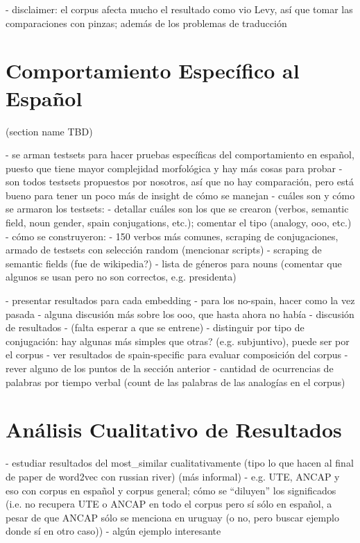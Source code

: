 - disclaimer: el corpus afecta mucho el resultado como vio Levy, así que tomar las comparaciones con pinzas; además de los problemas de traducción


\section{Comportamiento Específico al Español}
(section name TBD)

- se arman testsets para hacer pruebas específicas del comportamiento en español, puesto que tiene mayor complejidad morfológica y hay más cosas para probar
- son todos testsets propuestos por nosotros, así que no hay comparación, pero está bueno para tener un poco más de insight de cómo se manejan
- cuáles son y cómo se armaron los testsets:
    - detallar cuáles son los que se crearon (verbos, semantic field, noun gender, spain conjugations, etc.); comentar el tipo (analogy, ooo, etc.)
    - cómo se construyeron:
        - 150 verbos más comunes, scraping de conjugaciones, armado de testsets con selección random (mencionar scripts)
        - scraping de semantic fields (fue de wikipedia?)
        - lista de géneros para nouns (comentar que algunos se usan pero no son correctos, e.g. presidenta)

- presentar resultados para cada embedding
    - para los no-spain, hacer como la vez pasada
    - alguna discusión más sobre los ooo, que hasta ahora no había
- discusión de resultados
    - (falta esperar a que se entrene)
    - distinguir por tipo de conjugación: hay algunas más simples que otras? (e.g. subjuntivo), puede ser por el corpus
    - ver resultados de spain-specific para evaluar composición del corpus
    - rever alguno de los puntos de la sección anterior
    - cantidad de ocurrencias de palabras por tiempo verbal (count de las palabras de las analogías en el corpus)


\section{Análisis Cualitativo de Resultados}

- estudiar resultados del most\_similar cualitativamente (tipo lo que hacen al final de paper de word2vec con russian river)
  (más informal)
- e.g. UTE, ANCAP y eso con corpus en español y corpus general; cómo se ``diluyen'' los significados (i.e. no recupera UTE o ANCAP en todo el corpus pero sí sólo en español, a pesar de que ANCAP sólo se menciona en uruguay (o no, pero buscar ejemplo donde sí en otro caso))
- algún ejemplo interesante
